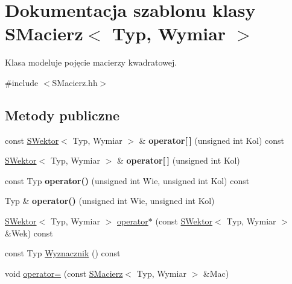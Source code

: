 \hypertarget{classSMacierz}{}\section{Dokumentacja szablonu klasy S\+Macierz$<$ Typ, Wymiar $>$}
\label{classSMacierz}


Klasa modeluje pojęcie macierzy kwadratowej.  




{\ttfamily \#include $<$S\+Macierz.\+hh$>$}

\subsection*{Metody publiczne}
\begin{DoxyCompactItemize}
\item 
\mbox{\label{classSMacierz_a7fa53b3a5b5b07e82493dc55447f5546}} 
const \hyperlink{classSWektor}{S\+Wektor}$<$ Typ, Wymiar $>$ \& {\bfseries operator\mbox{[}$\,$\mbox{]}} (unsigned int Kol) const
\item 
\mbox{\label{classSMacierz_afc5e3fea0f930ea3ed722551c5c7e553}} 
\hyperlink{classSWektor}{S\+Wektor}$<$ Typ, Wymiar $>$ \& {\bfseries operator\mbox{[}$\,$\mbox{]}} (unsigned int Kol)
\item 
\mbox{\label{classSMacierz_a3176386344a6b9be84922c736f04e7d6}} 
const Typ {\bfseries operator()} (unsigned int Wie, unsigned int Kol) const
\item 
\mbox{\label{classSMacierz_a799597af607b21870e608fe4afe6c4ed}} 
Typ \& {\bfseries operator()} (unsigned int Wie, unsigned int Kol)
\item 
\hyperlink{classSWektor}{S\+Wektor}$<$ Typ, Wymiar $>$ \hyperlink{classSMacierz_ae72c507f32c5ce3db5ded6acacc64bc3}{operator$\ast$} (const \hyperlink{classSWektor}{S\+Wektor}$<$ Typ, Wymiar $>$ \&Wek) const
\item 
const Typ \hyperlink{classSMacierz_a1445d4e0c95d303e28d2f89e9751d77d}{Wyznacznik} () const
\item 
void \hyperlink{classSMacierz_a3dd718281652814e45a5fe17f2c33b05}{operator=} (const \hyperlink{classSMacierz}{S\+Macierz}$<$ Typ, Wymiar $>$ \&Mac)
\end{DoxyCompactItemize}
